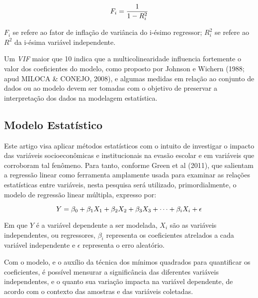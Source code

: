 \documentclass[english, spanish, brazilian]{RBIEarticle} %
\begin{document}
\vspace{0.5cm}
\begin{equation}
\large F_i = \frac{1}{1-R_i^2}
\end{equation}
\vspace{0.5cm}


$F_i$ se refere ao fator de inflação de variância do i-ésimo regressor; $R_i^2$ se refere ao $R^2$ da i-ésima variável independente.

Um \textit{VIF} maior que 10 indica que a multicolinearidade influencia fortemente o valor dos coeficientes do modelo, como proposto por Johnson e Wichern (1988; apud MILOCA \& CONEJO, 2008), e algumas medidas em relação ao conjunto de dados ou ao modelo devem ser tomadas com o objetivo de preservar a interpretação dos dados na modelagem estatística.

\subsection{Modelo Estatístico}
Este artigo visa aplicar métodos estatísticos com o intuito de investigar o impacto das variáveis socioeconômicas e institucionais na evasão escolar e em variáveis que corroboram tal fenômeno. Para tanto, conforme Green et al (2011), que salientam a regressão linear como ferramenta amplamente usada para examinar as relações estatísticas entre variáveis, nesta pesquisa será utilizado, primordialmente, o modelo de regressão linear múltipla, expresso por:

\vspace{0.5cm}
\begin{equation}
\large Y = \beta_0 + \beta_1X_1 + \beta_2X_2 + \beta_3X_3 + \cdots + \beta_iX_i + \epsilon 
\end{equation}
\vspace{0.5cm}

Em que $Y$ é a variável dependente a ser modelada, $X_i$ são as variáveis independentes, ou regressores, $\beta_i$ representa os coeficientes atrelados a cada variável independente e $\epsilon$ representa o erro aleatório. 

Com o modelo, e o auxílio da técnica dos mínimos quadrados para quantificar os coeficientes, é possível mensurar a significância das diferentes variáveis independentes, e o quanto sua variação impacta na variável dependente, de acordo com o contexto das amostras e das variáveis coletadas.
\end{document}
